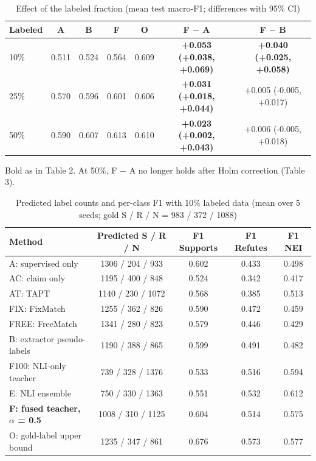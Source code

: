 \begin{table}[t]
\centering
\small
\caption{Effect of the labeled fraction (mean test macro-F1; differences with 95\% CI)}
\begin{tabular}{lcccccc}
\toprule
Labeled & A & B & F & O & F $-$ A & F $-$ B \\
\midrule
10\% & 0.511 & 0.524 & 0.564 & 0.609 & \textbf{+0.053 (+0.038, +0.069)} & \textbf{+0.040 (+0.025, +0.058)} \\
25\% & 0.570 & 0.596 & 0.601 & 0.606 & \textbf{+0.031 (+0.018, +0.044)} & +0.005 (-0.005, +0.017) \\
50\% & 0.590 & 0.607 & 0.613 & 0.610 & \textbf{+0.023 (+0.002, +0.043)} & +0.006 (-0.005, +0.018) \\
\bottomrule
\end{tabular}
\par\smallskip\footnotesize Bold as in Table 2. At 50\%, F $-$ A no longer holds after Holm correction (Table 3).
\end{table}

\begin{table}[t]
\centering
\small
\caption{Predicted label counts and per-class F1 with 10\% labeled data (mean over 5 seeds; gold S / R / N = 983 / 372 / 1088)}
\begin{tabular}{lcccc}
\toprule
Method & Predicted S / R / N & F1 Supports & F1 Refutes & F1 NEI \\
\midrule
A: supervised only & 1306 / 204 / 933 & 0.602 & 0.433 & 0.498 \\
AC: claim only & 1195 / 400 / 848 & 0.524 & 0.342 & 0.417 \\
AT: TAPT & 1140 / 230 / 1072 & 0.568 & 0.385 & 0.513 \\
FIX: FixMatch & 1255 / 362 / 826 & 0.590 & 0.472 & 0.459 \\
FREE: FreeMatch & 1341 / 280 / 823 & 0.579 & 0.446 & 0.429 \\
B: extractor pseudo-labels & 1190 / 388 / 865 & 0.599 & 0.491 & 0.482 \\
F100: NLI-only teacher & 739 / 328 / 1376 & 0.533 & 0.516 & 0.594 \\
E: NLI ensemble & 750 / 330 / 1363 & 0.551 & 0.532 & 0.612 \\
\textbf{F: fused teacher, $\alpha$ = 0.5} & 1008 / 310 / 1125 & 0.604 & 0.514 & 0.575 \\
O: gold-label upper bound & 1235 / 347 / 861 & 0.676 & 0.573 & 0.577 \\
\bottomrule
\end{tabular}
\end{table}
